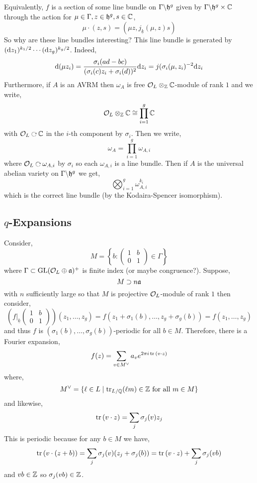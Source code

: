 \documentclass[12pt]{article}
\begin{document}
\begin{rmk}
Equivalently, $f$ is a section of some line bundle on $\Gamma \backslash \mathfrak{h}^g$ given by $\Gamma \backslash \mathfrak{h}^g \times \mathbb{C}$ through the action for $\mu \in \Gamma, z \in \mathfrak{h}^g, s \in \mathbb{C}$,
\[ \mu \cdot (z, s) = (\mu z, j_{\underline{k}}(\mu, z) s) \] 
So why are these line bundles interesting? This line bundle is generated by $(\mathrm{d}{z_1})^{k_1/2} \cdots (\mathrm{d}{z_g})^{k_g/2}$. Indeed,
\[ \mathrm{d}{(\mu z_i)} = \frac{\sigma_i(ad - bc)}{(\sigma_i(c) z_i + \sigma_i(d))^2} \mathrm{d}{z_i} = j(\sigma_i(\mu, z_i)^{-2} \mathrm{d}{z_i} \]
Furthermore, if $A$ is an AVRM then $\omega_A$ is free $\mathcal{O}_{L} \otimes_{\mathbb{Z}} \mathbb{C}$-module of rank $1$ and we write,
\[ \mathcal{O}_{L} \otimes_{\mathbb{Z}} \mathbb{C} \cong \prod_{i = 1}^g \mathbb{C} \]
with $\struct{L} \acts \CC$ in the $i$-th component by $\sigma_i$. Then we write,
\[ \omega_A = \prod_{i = 1}^g \omega_{A, i} \]
where $\struct{L} \acts \omega_{A, i}$ by $\sigma_i$ so each $\omega_{A,i}$ is a line bundle. Then if $A$ is the universal abelian variety on $\Gamma \backslash \mathfrak{h}^g$ we get,
\[ \bigotimes_{i = 1}^g \omega_{A,i}^{k_i} \]
which is the correct line bundle (by the Kodaira-Spencer isomorphism). 
\end{rmk}

\subsection{$q$-Expansions}

Consider,
\[ M = \left\{ b : \begin{pmatrix}
1 & b
\\
0 & 1
\end{pmatrix} \in \Gamma \right\} \]
where $\Gamma \subset \mathrm{GL}(\mathcal{O}_{L} \oplus \mathfrak{a})^+$ is finite index (or maybe congruence?). Suppose,
\[ M \supset n \mathfrak{a} \]
with $n$ sufficiently large so that $M$ is projective $\mathcal{O}_{L}$-module of rank $1$ then consider,
\[ \left( f\bigg|_{\underline{k}} \begin{pmatrix}
1 & b 
\\
0 & 1
\end{pmatrix} \right) (z_1, \dots, z_g) = f(z_1 + \sigma_1(b), \dots, z_g + \sigma_g(b)) = f(z_1, \dots, z_g) \]
and thus $f$ is $(\sigma_1(b), \dots, \sigma_g(b))$-periodic for all $b \in M$. Therefore, there is a Fourier expansion,
\[ f(z) = \sum_{v \in M^\vee} a_v e^{2 \pi i \operatorname{\mathrm{tr}}{(v \cdot z)}} \]
where,
\[ M^\vee = \{ \ell \in L \mid \operatorname{\mathrm{tr}}_{L / \mathbb{Q}}(\ell m) \in \mathbb{Z} \text{ for all } m \in M \} \]
and likewise,
\[ \operatorname{\mathrm{tr}}{(v \cdot z)} = \sum_{j} \sigma_j(v) z_j \]
This is periodic because for any $b \in M$ we have,
\[ \operatorname{\mathrm{tr}}{(v \cdot (z + b))} = \sum_j \sigma_j(v) (z_j + \sigma_j(b)) = \operatorname{\mathrm{tr}}{(v \cdot z)} + \sum_j \sigma_j(vb) \]
and $v b \in \mathbb{Z}$ so $\sigma_j(vb) \in \mathbb{Z}$. 
\end{document}
